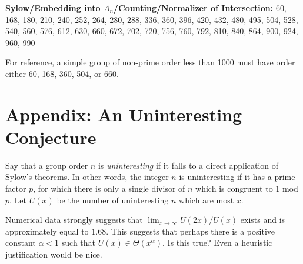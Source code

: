 \documentclass[11pt, oneside]{article}   	%
\begin{document}
\textbf{Sylow/Embedding into $A_n$/Counting/Normalizer of Intersection:}
60, 168, 180, 210, 240, 252, 264, 280, 288, 336, 360, 396, 420, 432, 480, 495, 504, 528, 540, 560, 576, 612, 630, 660, 672, 702, 720, 756, 760, 792, 810, 
840, 864, 900, 924, 960, 990
\newline

For reference, a simple group of non-prime order less than 1000 must have order either 60, 168, 360, 504, or 660.

\section{Appendix: An Uninteresting Conjecture}
Say that a group order $n$ is \textit{uninteresting} if it falls to a direct application of Sylow's theorems.  In other words, the integer $n$ is uninteresting if it has a prime factor $p$, for which there is only a single divisor of $n$ which is congruent to $1$ mod $p$.   Let $U(x)$ be the number of uninteresting $n$ which are most $x$.

Numerical data strongly suggests that $\lim_{x\rightarrow \infty} U(2x)/U(x)$ exists and is approximately equal to $1.68$.  This suggests that perhaps there is a positive constant $\alpha < 1$ such that $U(x) \in \Theta(x^{\alpha}).$  Is this true?  Even a heuristic justification would be nice.  
\end{document}
